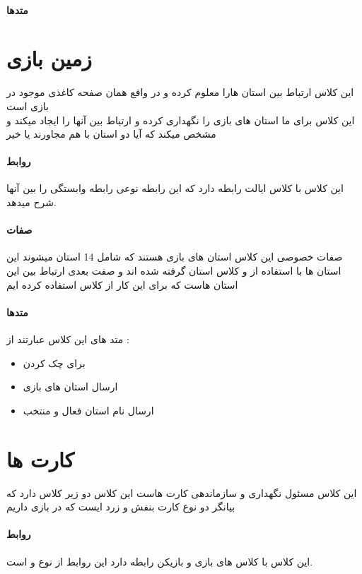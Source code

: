 \documentclass[pdf,titlepage,a4paper]{report}
\begin{document}
	\paragraph{متدها}


	\newpage
	\section{زمین بازی}
    این کلاس ارتباط بین استان هارا معلوم کرده و در واقع همان صفحه کاغذی موجود در بازی است \\
    این کلاس برای ما استان های بازی را نگهداری کرده و ارتباط بین آنها را ایجاد میکند و مشخص میکند که آیا دو استان با هم مجاورند یا خیر 
    \paragraph{روابط}
	این کلاس با کلاس ایالت رابطه دارد که این رابطه نوعی رابطه وابستگی را بین آنها شرح میدهد.\\
	\paragraph{صفات}
	صفات خصوصی این کلاس استان های بازی هستند که شامل 14 استان میشوند 
	این استان ها با استفاده از  و کلاس استان گرفته شده اند
	و صفت بعدی ارتباط بین این استان هاست که برای این کار از کلاس  استفاده کرده ایم
	\paragraph{متدها}
	
	متد های این کلاس عبارتند از :

	\begin{itemize}
		\item {} برای چک کردن 
		\item {} ارسال استان های بازی 
		\item {} ارسال نام استان فعال و منتخب
	\end{itemize}
	
	\newpage
	\section{کارت ها}
	این کلاس مسئول نگهداری و سازماندهی کارت هاست این کلاس دو زیر کلاس دارد که بیانگر دو نوع کارت بنفش و زرد ایست که در بازی داریم
    \paragraph{روابط}
    این کلاس با کلاس های بازی و بازیکن رابطه دارد
	این روابط از نوع  و  است.\\
	
\end{document}
